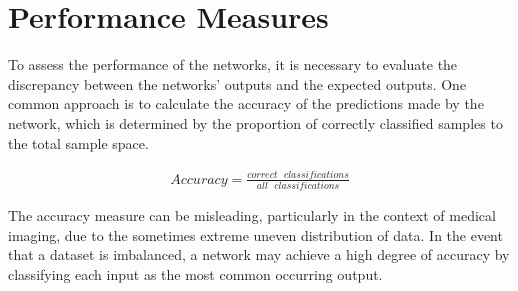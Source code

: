 \documentclass[
a4paper, 
12pt,
grayscalebody, %
abstract=on,
twoside, BCOR10mm, 12pt, DIV13,headinclude, footexclude, final, abstracton, openright
]{ibireprt}
\numberwithin{equation}{chapter}
\numberwithin{table}{chapter}
\numberwithin{figure}{chapter}
\numberwithin{algorithm}{chapter}
\numberwithin{example}{chapter}
\numberwithin{example}{chapter}
\begin{document}
\section{Performance Measures}

To assess the performance of the networks, it is necessary to evaluate the discrepancy between the networks' outputs and the expected outputs. One common approach is to calculate the accuracy of the predictions made by the network, which is determined by the proportion of correctly classified samples to the total sample space.

\begin{align}
	Accuracy = \frac{correct\text{ } classifications}{all\text{ } classifications}
\end{align}

The accuracy measure can be misleading, particularly in the context of medical imaging, due to the sometimes extreme uneven distribution of data. In the event that a dataset is imbalanced, a network may achieve a high degree of accuracy by classifying each input as the most common occurring output.




\end{document}
